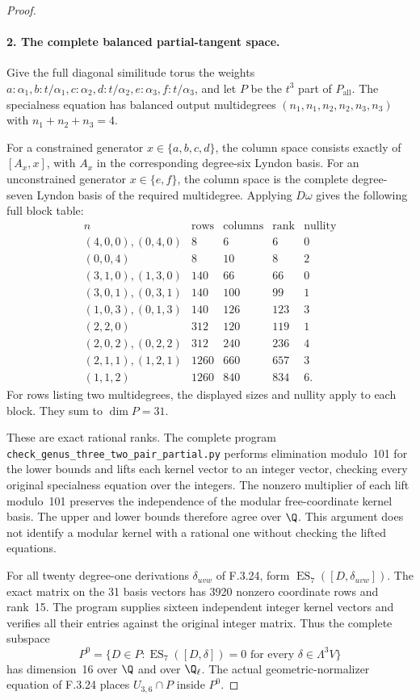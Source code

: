 \begin{proof}
\paragraph{2. The complete balanced partial-tangent space.}
Give the full diagonal similitude torus the weights
$a:\alpha_1,b:t/\alpha_1,c:\alpha_2,d:t/\alpha_2,
e:\alpha_3,f:t/\alpha_3$, and let $P$ be the
$t^3$ part of $P_{\mathrm{all}}$.
The specialness equation has balanced output
multidegrees $(n_1,n_1,n_2,n_2,n_3,n_3)$ with
$n_1+n_2+n_3=4$.

For a constrained generator $x\in\{a,b,c,d\}$,
the column space consists exactly of
$[A_x,x]$, with $A_x$ in the corresponding
degree-six Lyndon basis. For an unconstrained
generator $x\in\{e,f\}$, the column space
is the complete degree-seven Lyndon basis
of the required multidegree. Applying
$D\omega$ gives the following full block table:
\[
\begin{array}{c|r|r|r|r}
n&\text{rows}&\text{columns}&\text{rank}&\text{nullity}\\\hline
(4,0,0),(0,4,0)&8&6&6&0\\
(0,0,4)&8&10&8&2\\
(3,1,0),(1,3,0)&140&66&66&0\\
(3,0,1),(0,3,1)&140&100&99&1\\
(1,0,3),(0,1,3)&140&126&123&3\\
(2,2,0)&312&120&119&1\\
(2,0,2),(0,2,2)&312&240&236&4\\
(2,1,1),(1,2,1)&1260&660&657&3\\
(1,1,2)&1260&840&834&6.
\end{array}                                               \tag{PT.4}
\]
For rows listing two multidegrees, the displayed
sizes and nullity apply to each block. They sum
to $\dim P=31$.

These are exact rational ranks. The complete
program \texttt{check\_genus\_three\_two\_pair\_}\allowbreak\texttt{partial.py}
performs elimination modulo~101 for the lower
bounds and lifts each kernel vector to an
integer vector, checking every original
specialness equation over the integers.
The nonzero multiplier of each lift modulo~101
preserves the independence of the modular
free-coordinate kernel basis. The upper and
lower bounds therefore agree over $\Q$.
This argument does not identify a modular
kernel with a rational one without checking
the lifted equations.

For all twenty degree-one derivations
$\delta_{uvw}$ of F.3.24, form
$\operatorname{ES}_7([D,\delta_{uvw}])$.
The exact matrix on the 31 basis vectors has
3920 nonzero coordinate rows and rank~15.
The program supplies sixteen independent
integer kernel vectors and verifies all their
entries against the original integer matrix.
Thus the complete subspace
\[
 P^0=\{D\in P:\operatorname{ES}_7([D,\delta])=0
                      \text{ for every }\delta\in\Lambda^3V\}
\]
has dimension~16 over $\Q$ and over $\Q_\ell$.
The actual geometric-normalizer equation of
F.3.24 places $U_{3,6}\cap P$ inside $P^0$.


\end{proof}
